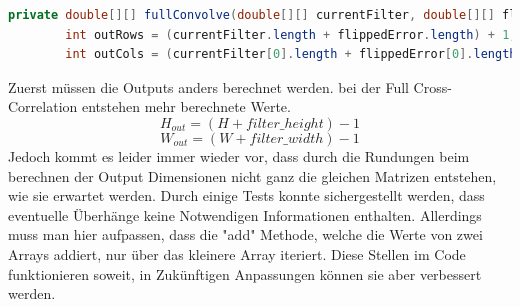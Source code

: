 \documentclass[12pt]{article}
\begin{document}
\begin{lstlisting}[language=Java]
private double[][] fullConvolve(double[][] currentFilter, double[][] flippedError) {
        int outRows = (currentFilter.length + flippedError.length) + 1;
        int outCols = (currentFilter[0].length + flippedError[0].length) + 1;
\end{lstlisting}
Zuerst müssen die Outputs anders berechnet werden. bei der Full Cross-Correlation entstehen mehr berechnete Werte. 
$$H_{out} = (H + filter\_height)-1$$
$$W_{out} = (W + filter\_ width)-1$$
Jedoch kommt es leider immer wieder vor, dass durch die Rundungen beim berechnen der Output Dimensionen nicht ganz die gleichen Matrizen entstehen, wie sie erwartet werden. Durch einige Tests konnte sichergestellt werden, dass eventuelle Überhänge keine Notwendigen Informationen enthalten. Allerdings muss man hier aufpassen, dass die "add" Methode, welche die Werte von zwei Arrays addiert, nur über das kleinere Array iteriert. Diese Stellen im Code funktionieren soweit, in Zukünftigen Anpassungen können sie aber verbessert werden. 
\end{document}
